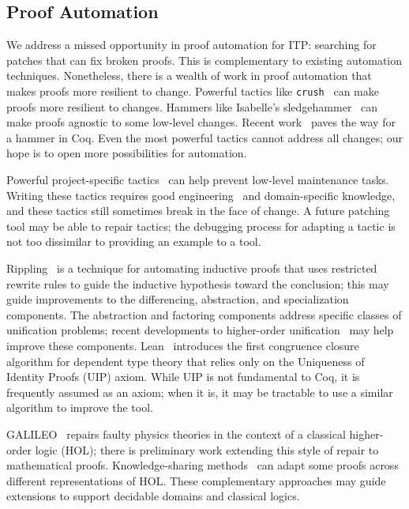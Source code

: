 \subsection*{Proof Automation}


We address a missed opportunity in proof automation for ITP: searching
for patches that can fix broken proofs.
This is complementary to existing automation techniques. Nonetheless, there is a wealth
of work in proof automation that makes proofs more resilient to change.
Powerful tactics like \lstinline{crush}~\cite{chlipala:cpdt} can make
proofs more resilient to changes. 
Hammers like Isabelle's sledgehammer~\cite{Blanchette2013} can make proofs agnostic to some low-level changes.
Recent work~\cite{coqhammer} paves the way for a hammer in Coq.
Even the most powerful tactics cannot address all changes;
our hope is to open more possibilities for automation.

Powerful project-specific tactics~\cite{chlipala:cpdt, Chlipala2013} can help prevent low-level maintenance tasks.
Writing these tactics requires good engineering~\cite{Gonthier2011} and domain-specific knowledge,
and these tactics still sometimes break in the face of change.
A future patching tool may be able to repair tactics; the debugging process
for adapting a tactic is not too dissimilar to providing an example to a tool.

Rippling~\cite{rippling} is a technique for automating inductive proofs that uses restricted rewrite rules to
guide the inductive hypothesis toward the conclusion; this may guide improvements to the
differencing, abstraction, and specialization components.
The abstraction and factoring components address specific classes of unification problems;
recent developments to higher-order unification~\cite{Miller:2012:PHL:2331097} may help
improve these components.
Lean~\cite{selsam:lean} introduces the first congruence closure algorithm for dependent type theory that
relies only on the Uniqueness of Identity Proofs (UIP) axiom. While UIP is not fundamental to Coq,
it is frequently assumed as an axiom; when it is, it may be tractable to use a similar algorithm to improve the tool.

GALILEO~\cite{bundyreasoning} repairs faulty physics theories
in the context of a classical higher-order logic (HOL); there is preliminary work extending this
style of repair to mathematical proofs. 
Knowledge-sharing methods~\cite{tgck-cicm14} can adapt some proofs across different representations of HOL.
These complementary approaches may guide extensions to support decidable domains and classical logics.


